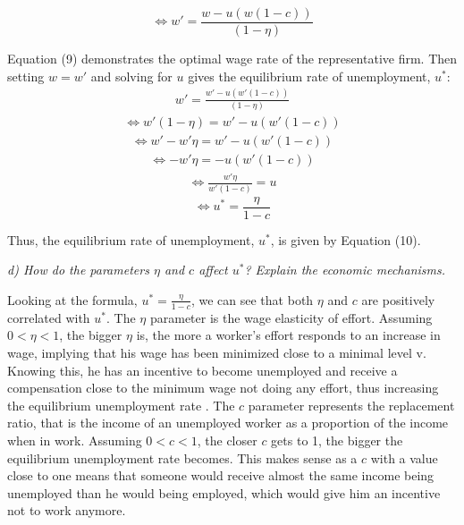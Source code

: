 \documentclass[11pt]{article} %
\begin{document}
\begin{equation}
   \Longleftrightarrow w' = \frac{w - u\left(w (1 - c)\right)} {(1 - \eta)}
\end{equation}

\bigskip
Equation (9) demonstrates the optimal wage rate of the representative firm. Then setting $w=w'$ and solving for $u$ gives the equilibrium rate of unemployment, $u^*$:
\begin{align*}
    w' = \frac{w' - u\left(w' (1 - c)\right)} {(1 - \eta)}
\end{align*}
\begin{align*}
   \Longleftrightarrow w'(1 - \eta) = {w' - u\left(w' (1 - c)\right)} 
\end{align*}
\begin{align*}
   \Longleftrightarrow w' - w'\eta = {w' - u\left(w' (1 - c)\right)} 
\end{align*}
\begin{align*}
   \Longleftrightarrow - w'\eta = {- u\left(w' (1 - c)\right)} 
\end{align*}
\begin{align*}
   \Longleftrightarrow \frac{w' \eta}{w'(1-c)} = u 
\end{align*}
\begin{equation}
    \Longleftrightarrow u^* = \frac{\eta}{1-c}
\end{equation}

\bigskip
Thus, the equilibrium rate of unemployment, $u^*$, is given by Equation (10).






\pagebreak
\textit{d) How do the parameters $\eta$ and $c$ affect $u^*$? Explain the economic mechanisms.}

\bigskip
Looking at the formula, $u^* = \frac {\eta} {1 -c}$, we can see that both $\eta$ and $c$ are positively correlated with $u^*$. The $\eta$ parameter is the wage elasticity of effort. Assuming $0 < \eta < 1$, the bigger $\eta$ is, the more a worker's effort responds to an increase in wage, implying that his wage has been minimized close to a minimal level v. Knowing this, he has an incentive to become unemployed and receive a compensation close to the minimum wage not doing any effort, thus increasing the equilibrium unemployment rate . The $c$ parameter represents the replacement ratio, that is the income of an unemployed worker as a proportion of the income when in work. Assuming $0 < c < 1$, the closer $c$ gets to 1, the bigger the equilibrium unemployment rate becomes. This makes sense as a $c$ with a value close to one means that someone would receive almost the same income being unemployed than he would being employed, which would give him an incentive not to work anymore.
\end{document}
